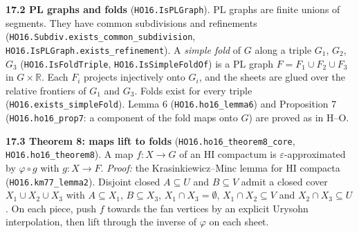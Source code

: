 \documentclass[11pt]{article}
\newcommand{\lean}[1]{\texttt{#1}}
\begin{document}
\textbf{17.2 PL graphs and folds} (\lean{HO16.\hspace{0pt}IsPLGraph}). PL graphs are finite unions of segments. They have common subdivisions and refinements (\lean{HO16.\hspace{0pt}Subdiv.\hspace{0pt}exists\_\hspace{0pt}common\_\hspace{0pt}subdivision}, \lean{HO16.\hspace{0pt}IsPLGraph.\hspace{0pt}exists\_\hspace{0pt}refinement}). A \emph{simple fold} of $G$ along a triple $G_1$, $G_2$, $G_3$ (\lean{HO16.\hspace{0pt}IsFoldTriple}, \lean{HO16.\hspace{0pt}IsSimpleFoldOf}) is a PL graph $F = F_1 \cup F_2 \cup F_3$ in $G \times \mathbb{R}$. Each $F_i$ projects injectively onto $G_i$, and the sheets are glued over the relative frontiers of $G_1$ and $G_3$. Folds exist for every triple (\lean{HO16.\hspace{0pt}exists\_\hspace{0pt}simpleFold}). Lemma 6 (\lean{HO16.\hspace{0pt}ho16\_\hspace{0pt}lemma6}) and Proposition 7 (\lean{HO16.\hspace{0pt}ho16\_\hspace{0pt}prop7}: a component of the fold maps onto $G$) are proved as in H--O.

\textbf{17.3 Theorem 8: maps lift to folds} (\lean{HO16.\hspace{0pt}ho16\_\hspace{0pt}theorem8\_\hspace{0pt}core}, \lean{HO16.\hspace{0pt}ho16\_\hspace{0pt}theorem8}). A map $f : X \to G$ of an HI compactum is $\varepsilon$-approximated by $\varphi \circ g$ with $g : X \to F$. \emph{Proof:} the Krasinkiewicz--Minc lemma for HI compacta (\lean{HO16.\hspace{0pt}km77\_\hspace{0pt}lemma2}). Disjoint closed $A \subseteq U$ and $B \subseteq V$ admit a closed cover $X_1 \cup X_2 \cup X_3$ with $A \subseteq X_1$, $B \subseteq X_3$, $X_1 \cap X_3 = \emptyset$, $X_1 \cap X_2 \subseteq V$ and $X_2 \cap X_3 \subseteq U$. On each piece, push $f$ towards the fan vertices by an explicit Urysohn interpolation, then lift through the inverse of $\varphi$ on each sheet.
\end{document}
